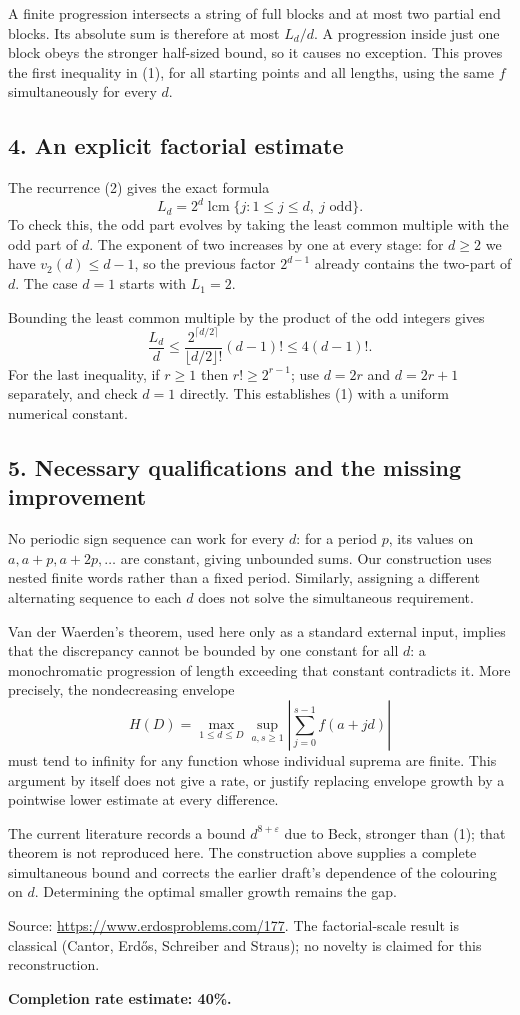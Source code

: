 A finite progression intersects a string of full blocks and at most two partial end blocks. Its absolute sum is therefore at most $L_d/d$. A progression inside just one block obeys the stronger half-sized bound, so it causes no exception. This proves the first inequality in (1), for all starting points and all lengths, using the same $f$ simultaneously for every $d$.

\subsection*{4. An explicit factorial estimate}
The recurrence (2) gives the exact formula
\[
 L_d=2^d\operatorname{lcm}\{j:1\le j\le d,\ j\text{ odd}\}.\tag{3}
\]
To check this, the odd part evolves by taking the least common multiple with the odd part of $d$. The exponent of two increases by one at every stage: for $d\ge2$ we have $v_2(d)\le d-1$, so the previous factor $2^{d-1}$ already contains the two-part of $d$. The case $d=1$ starts with $L_1=2$.

Bounding the least common multiple by the product of the odd integers gives
\[
 \frac{L_d}{d}
 \le\frac{2^{\lceil d/2\rceil}}{\lfloor d/2\rfloor!}(d-1)!
 \le4(d-1)!.
\]
For the last inequality, if $r\ge1$ then $r!\ge2^{r-1}$; use $d=2r$ and $d=2r+1$ separately, and check $d=1$ directly. This establishes (1) with a uniform numerical constant.

\subsection*{5. Necessary qualifications and the missing improvement}
No periodic sign sequence can work for every $d$: for a period $p$, its values on $a,a+p,a+2p,\ldots$ are constant, giving unbounded sums. Our construction uses nested finite words rather than a fixed period. Similarly, assigning a different alternating sequence to each $d$ does not solve the simultaneous requirement.

Van der Waerden's theorem, used here only as a standard external input, implies that the discrepancy cannot be bounded by one constant for all $d$: a monochromatic progression of length exceeding that constant contradicts it. More precisely, the nondecreasing envelope
\[
 H(D)=\max_{1\le d\le D}\sup_{a,s\ge1}\left|\sum_{j=0}^{s-1}f(a+jd)\right|
\]
must tend to infinity for any function whose individual suprema are finite. This argument by itself does not give a rate, or justify replacing envelope growth by a pointwise lower estimate at every difference.

The current literature records a bound $d^{8+\varepsilon}$ due to Beck, stronger than (1); that theorem is not reproduced here. The construction above supplies a complete simultaneous bound and corrects the earlier draft's dependence of the colouring on $d$. Determining the optimal smaller growth remains the gap.

Source: \url{https://www.erdosproblems.com/177}. The factorial-scale result is classical (Cantor, Erd\H{o}s, Schreiber and Straus); no novelty is claimed for this reconstruction.

\textbf{Completion rate estimate: 40\%.}

